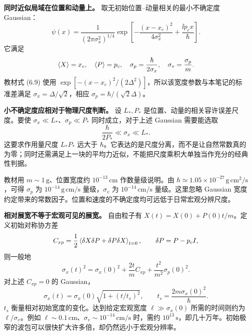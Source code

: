 

\textbf{同时近似局域在位置和动量上。}
取无初始位置--动量相关的最小不确定度 Gaussian：
\begin{equation}
  \psi(x)=\frac{1}{(2\pi\sigma_x^2)^{1/4}}
    \exp\left[-\frac{(x-x_c)^2}{4\sigma_x^2}
              +\frac{\ii p_cx}{\hbar}\right].
\end{equation}
它满足
\begin{equation}
  \left\langle X \right\rangle=x_c,\quad \left\langle P \right\rangle=p_c,\quad
  \sigma_p=\frac{\hbar}{2\sigma_x},\quad
  \sigma_v=\frac{\sigma_p}{m}.
  \label{eq:QM-C06-S01-gaussian-scales}
\end{equation}
教材式 (6.9) 使用 $\exp[-(x-x_c)^2/(2\Delta^2)]$，所以该宽度参数与本笔记的标准差满足 $\sigma_x=\Delta/\sqrt2$，相应 $\sigma_p=\hbar/(\sqrt2\Delta)$。

\textbf{小不确定度应相对于物理尺度判断。}
设 $L_*,P_*$ 是位置、动量的相关容许误差尺度。要使 $\sigma_x\ll L_*$、$\sigma_p\ll P_*$ 同时成立，对于上述 Gaussian 需要能选取
\begin{equation}
  \boxed{\frac{\hbar}{2P_*}\ll\sigma_x\ll L_*}.
\end{equation}
这要求作用量尺度 $L_*P_*$ 远大于 $\hbar$。它表达的是尺度分离，而不是让自然常数真的为零；同时还需满足上一块的平均力近似，不能把尺度乘积大单独当作充分的经典性判据。

教材用 $m\sim1\,\mathrm g$、位置宽度约 $10^{-13}\,\mathrm{cm}$ 作数量级说明。由 $\hbar\simeq1.05\times10^{-27}\,\mathrm{g\,cm^2/s}$，可得 $\sigma_p$ 为 $10^{-14}\,\mathrm{g\,cm/s}$ 量级，$\sigma_v$ 为 $10^{-14}\,\mathrm{cm/s}$ 量级。这里忽略 Gaussian 宽度约定带来的常数因子。位置和速度的不确定度均可远低于日常宏观分辨尺度。

\textbf{相对展宽不等于宏观可见的展宽。}
自由粒子有 $X(t)=X(0)+P(0)t/m$。定义初始对称协方差
\begin{equation}
  C_{xp}=\frac12\left\langle \delta X\delta P+\delta P\delta X \right\rangle_{t=0},
  \qquad \delta P=P-p_cI,
\end{equation}
则一般地
\begin{equation}
  \sigma_x(t)^2=\sigma_x(0)^2+\frac{2t}{m}C_{xp}
                         +\frac{t^2}{m^2}\sigma_p(0)^2.
\end{equation}
对上述 $C_{xp}=0$ 的 Gaussian，
\begin{equation}
  \boxed{\sigma_x(t)=\sigma_x(0)\sqrt{1+(t/t_s)^2}},
  \qquad
  \boxed{t_s=\frac{2m\sigma_x(0)^2}{\hbar}}.
  \label{eq:QM-C06-S01-spreading}
\end{equation}
$t_s$ 衡量相对初始宽度的变化。达到给定宏观宽度 $\ell\gg\sigma_x(0)$ 所需的时间则约为 $\ell/\sigma_v$。例如 $\ell\sim0.1\,\mathrm{cm}$、$\sigma_v\sim10^{-14}\,\mathrm{cm/s}$ 时，需约 $10^{13}\,\mathrm s$，即几十万年。初始极窄的波包可以很快扩大许多倍，却仍然远小于宏观分辨率。

